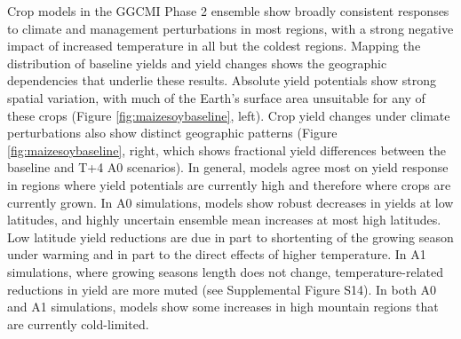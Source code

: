 \documentclass[gmd, manuscript]{copernicus} %
\begin{document}
Crop models in the GGCMI Phase 2 ensemble show broadly consistent responses to climate and management perturbations in most regions, with a strong negative impact of increased temperature in all but the coldest regions. 
Mapping the distribution of baseline yields and yield changes shows the geographic dependencies that underlie these results. 
Absolute yield potentials show strong spatial variation, with much of the Earth's surface area unsuitable for any of these crops (Figure \ref{fig:maizesoybaseline}, left).
Crop yield changes under climate perturbations also show distinct geographic patterns (Figure \ref{fig:maizesoybaseline}, right, which shows fractional yield differences between the baseline and T+4 A0 scenarios).
In general, models agree most on yield response in regions where yield potentials are currently high and therefore where crops are currently grown. 
In A0 simulations, models show robust decreases in yields at low latitudes, and highly uncertain ensemble mean increases at most high latitudes.
Low latitude yield reductions are due in part to shortenting of the growing season under warming and in part to the direct effects of higher temperature.
In A1 simulations, where growing seasons length does not change, temperature-related reductions in yield are more muted (see Supplemental Figure S14).
In both A0 and A1 simulations, models show some increases in high mountain regions that are currently cold-limited.
\end{document}
